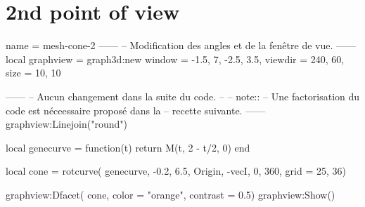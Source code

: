 \documentclass[varwidth, border = 3pt]{standalone}
\begin{document}
\section*{2nd point of view}

\begin{luadraw}{name = mesh-cone-2}
------
-- Modification des angles et de la fenêtre de vue.
------
    local graphview = graph3d:new{
        window  = {-1.5, 7, -2.5, 3.5},
        viewdir = {240, 60},
        size    = {10, 10}
    }

------
-- Aucun changement dans la suite du code.
--
-- note::
--     Une factorisation du code est néceessaire proposé dans la
--     recette suivante.
------
    graphview:Linejoin("round")

    local genecurve = function(t)
        return M(t, 2 - t/2, 0)
    end

    local cone = rotcurve(
        genecurve,
        -0.2, 6.5,
        {Origin, -vecI},
        0, 360,
        {grid = {25, 36}})

    graphview:Dfacet(
        cone,
        {color    = "orange",
         contrast = 0.5})
    graphview:Show()
\end{luadraw}
\end{document}
